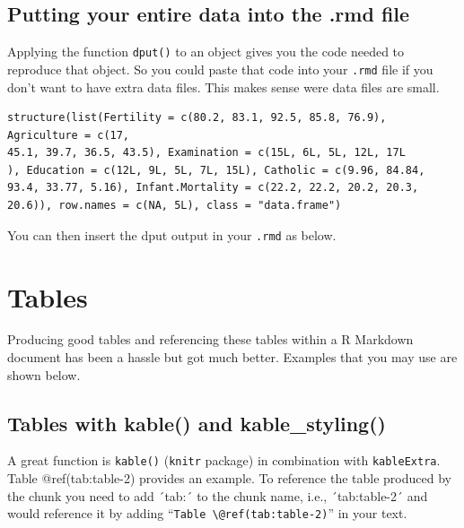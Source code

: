 \documentclass[
  letterpaper,
  DIV=11,
  numbers=noendperiod]{scrartcl}
\begin{document}
\hypertarget{putting-your-entire-data-into-the-.rmd-file}{%
\subsection{Putting your entire data into the .rmd
file}\label{putting-your-entire-data-into-the-.rmd-file}}

Applying the function \texttt{dput()} to an object gives you the code
needed to reproduce that object. So you could paste that code into your
\texttt{.rmd} file if you don't want to have extra data files. This
makes sense were data files are small.

\begin{verbatim}
structure(list(Fertility = c(80.2, 83.1, 92.5, 85.8, 76.9), Agriculture = c(17, 
45.1, 39.7, 36.5, 43.5), Examination = c(15L, 6L, 5L, 12L, 17L
), Education = c(12L, 9L, 5L, 7L, 15L), Catholic = c(9.96, 84.84, 
93.4, 33.77, 5.16), Infant.Mortality = c(22.2, 22.2, 20.2, 20.3, 
20.6)), row.names = c(NA, 5L), class = "data.frame")
\end{verbatim}

You can then insert the dput output in your \texttt{.rmd} as below.

\hypertarget{sec:tables}{%
\section{Tables}\label{sec:tables}}

Producing good tables and referencing these tables within a R Markdown
document has been a hassle but got much better. Examples that you may
use are shown below.

\hypertarget{tables-with-kable-and-kable_styling}{%
\subsection{Tables with kable() and
kable\_styling()}\label{tables-with-kable-and-kable_styling}}

A great function is \texttt{kable()} (\texttt{knitr} package) in
combination with \texttt{kableExtra}. Table @ref(tab:table-2) provides
an example. To reference the table produced by the chunk you need to add
´tab:´ to the chunk name, i.e., ´tab:table-2´ and would reference it by
adding ``\texttt{Table\ \textbackslash{}@ref(tab:table-2)}'' in your
text.
\end{document}
